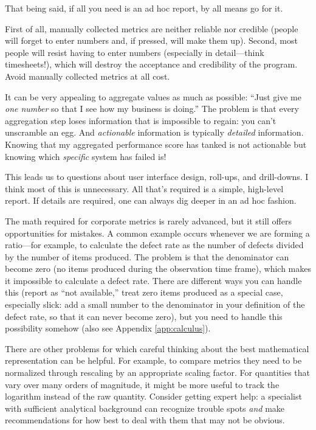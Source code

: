 That being said, if all you need is an ad hoc report, by all means go
for it.

First of all, manually collected metrics are neither reliable nor
credible (people will forget to enter numbers and, if pressed, will
make them up). Second, most people will resist having to enter numbers
(especially in detail---think timesheets!), which will destroy the
acceptance and credibility of the program.  Avoid manually collected
metrics at all cost.

It can be very appealing to aggregate values as much as possible:
``Just give me \emph{one number} so that I see how my business is
doing.'' The problem is that every aggregation step loses information
that is impossible to regain: you can't unscramble an egg. And
\emph{actionable} information is typically \emph{detailed}
information. Knowing that my aggregated performance score has tanked
is not actionable but knowing which \emph{specific} system has failed
is!

This leads us to questions about user interface design, roll-ups, and
drill-downs. I think most of this is unnecessary. All that's required
is a simple, high-level report.  If details are required, one can
always dig deeper in an ad hoc fashion.

The math required for corporate metrics is rarely advanced, but it
still offers opportunities for mistakes. A common example occurs
whenever we are forming a ratio---for example, to calculate the defect
rate as the number of defects divided by the number of items produced.
The problem is that the denominator can become zero (no items produced
during the observation time frame), which makes it impossible to
calculate a defect rate. There are different ways you can handle this
(report as ``not available,'' treat zero items produced as a special
case, especially slick: add a small number to the denominator in your
definition of the defect rate, so that it can never become zero), but
you need to handle this possibility somehow (also see Appendix
\ref{app:calculus}).


There are other problems for which careful thinking about the best
mathematical representation can be helpful.  For example, to compare
metrics they need to be normalized through rescaling by an appropriate
scaling factor. For quantities that vary over many orders of
magnitude, it might be more useful to track the logarithm instead of
the raw quantity. Consider getting expert help: a specialist with
sufficient analytical background can recognize trouble spots
\emph{and} make recommendations for how best to deal with them that
may not be obvious.\vfill\pagebreak

